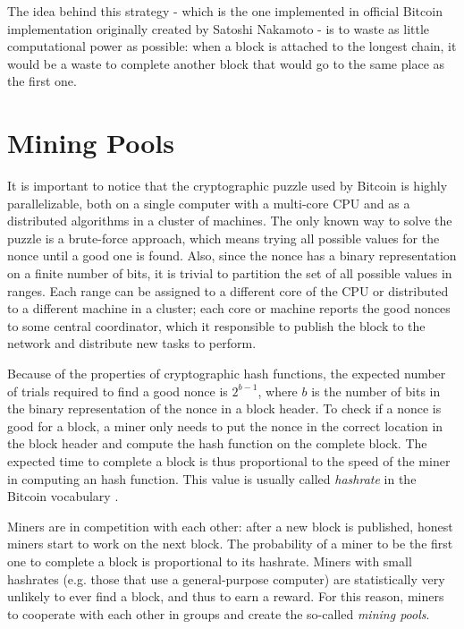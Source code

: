 The idea behind this strategy - which is the one implemented in official Bitcoin implementation originally created by Satoshi Nakamoto \cite{bitcoin_github} - is to waste as little computational power as possible:
when a block is attached to the longest chain, it would be a waste to complete another block that would go to the same place as the first one.

\section{Mining Pools}
It is important to notice that the cryptographic puzzle used by Bitcoin is highly parallelizable, both on a single computer with a multi-core \ac{CPU} and as a distributed algorithms in a cluster of machines.
The only known way to solve the puzzle is a brute-force approach, which means trying all possible values for the nonce until a good one is found.
Also, since the nonce has a binary representation on a finite number of bits, it is trivial to partition the set of all possible values in ranges.
Each range can be assigned to a different core of the \ac{CPU} or distributed to a different machine in a cluster;
each core or machine reports the good nonces to some central coordinator, which it responsible to publish the block to the network and distribute new tasks to perform.

Because of the properties of cryptographic hash functions, the expected number of trials required to find a good nonce is $2^{b - 1}$, where $b$ is the number of bits in the binary representation of the nonce in a block header.
To check if a nonce is good for a block, a miner only needs to put the nonce in the correct location in the block header and compute the hash function on the complete block.
The expected time to complete a block is thus proportional to the speed of the miner in computing an hash function.
This value is usually called \textit{hashrate} in the Bitcoin vocabulary \cite{bitcoin_vocabulary}.

Miners are in competition with each other:
after a new block is published, honest miners start to work on the next block.
The probability of a miner to be the first one to complete a block is proportional to its hashrate.
Miners with small hashrates (e.g. those that use a general-purpose computer) are statistically very unlikely to ever find a block, and thus to earn a reward.
For this reason, miners to cooperate with each other in groups and create the so-called \textit{mining pools}.

